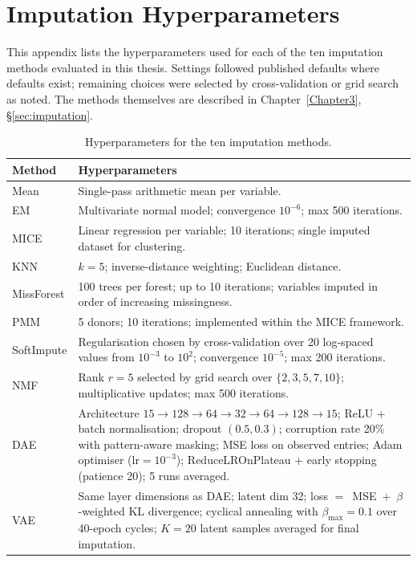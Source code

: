 
\chapter{Imputation Hyperparameters}

\label{AppendixA}

This appendix lists the hyperparameters used for each of the ten imputation methods evaluated in this thesis. Settings followed published defaults where defaults exist; remaining choices were selected by cross-validation or grid search as noted. The methods themselves are described in Chapter~\ref{Chapter3}, §\ref{sec:imputation}.

\begin{table}[ht]
\caption{Hyperparameters for the ten imputation methods.}
\label{tab:imputation_hyperparams}
\centering
\footnotesize
\renewcommand{\arraystretch}{1.2}
\begin{tabular}{@{} l p{10.5cm} @{}}
\toprule
\textbf{Method} & \textbf{Hyperparameters} \\
\midrule
Mean       & Single-pass arithmetic mean per variable. \\
EM         & Multivariate normal model; convergence $10^{-6}$; max 500 iterations. \\
MICE       & Linear regression per variable; 10 iterations; single imputed dataset for clustering. \\
KNN        & $k = 5$; inverse-distance weighting; Euclidean distance. \\
MissForest & 100 trees per forest; up to 10 iterations; variables imputed in order of increasing missingness. \\
PMM        & 5 donors; 10 iterations; implemented within the MICE framework. \\
SoftImpute & Regularisation chosen by cross-validation over 20 log-spaced values from $10^{-3}$ to $10^{2}$; convergence $10^{-5}$; max 200 iterations. \\
NMF        & Rank $r = 5$ selected by grid search over $\{2, 3, 5, 7, 10\}$; multiplicative updates; max 500 iterations. \\
DAE        & Architecture $15 \to 128 \to 64 \to 32 \to 64 \to 128 \to 15$; ReLU + batch normalisation; dropout $(0.5, 0.3)$; corruption rate 20\% with pattern-aware masking; MSE loss on observed entries; Adam optimiser ($\text{lr} = 10^{-3}$); ReduceLROnPlateau + early stopping (patience 20); 5 runs averaged. \\
VAE        & Same layer dimensions as DAE; latent dim 32; loss $= $~MSE~$+$~$\beta$-weighted KL divergence; cyclical annealing with $\beta_{\max} = 0.1$ over 40-epoch cycles; $K = 20$ latent samples averaged for final imputation. \\
\bottomrule
\end{tabular}
\end{table}
